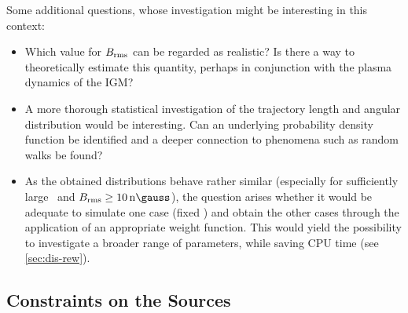 Some additional questions, whose investigation might be interesting in this
context:
\begin{itemize}
    \item Which value for $B_{\mathrm{rms}}$ can be regarded as realistic? Is there a way
        to theoretically estimate this quantity, perhaps in conjunction with
        the plasma dynamics of the IGM?

    \item A more thorough statistical investigation of the trajectory length
        and angular distribution would be interesting. Can an underlying
        probability density function be identified and a deeper connection to
        phenomena such as random walks be found?

    \item As the obtained distributions behave rather similar (especially for
        sufficiently large \Robserver~and $\Brms\ge\SI{10}{\nano\gauss}$), the
        question arises whether it would be adequate to simulate one case
        (fixed \Brms) and obtain the other cases through the application of an
        appropriate weight function. This would yield the possibility to
        investigate a broader range of parameters, while saving CPU time (see
        \cref{sec:dis-rew}).

\end{itemize}


\subsection{Constraints on the Sources}


